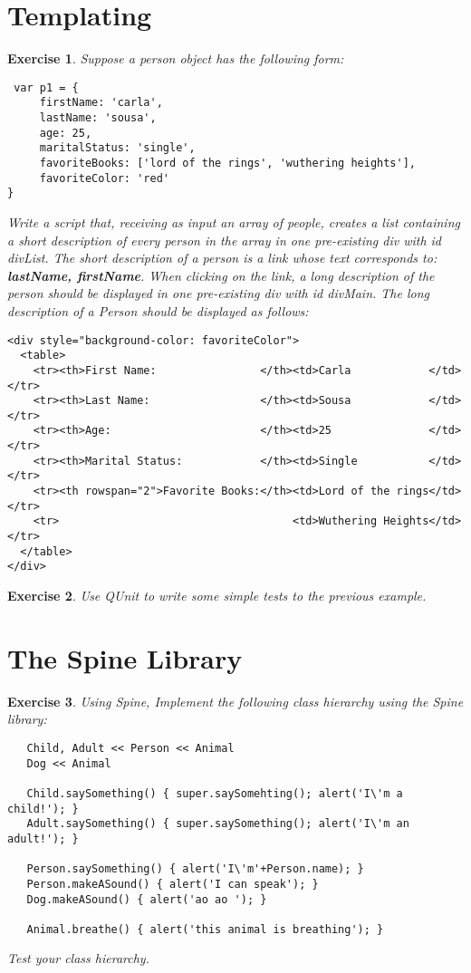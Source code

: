 \documentclass{article}
\newtheorem{ex}{Exercise}[section]
\begin{document}
\section{Templating} 

\begin{ex}
Suppose a person object has the following form: 
\begin{verbatim}
 var p1 = {
     firstName: 'carla', 
     lastName: 'sousa',
     age: 25, 
     maritalStatus: 'single', 
     favoriteBooks: ['lord of the rings', 'wuthering heights'], 
     favoriteColor: 'red'
}
\end{verbatim}
Write a script that, receiving as input an array of people, creates 
a list containing a short description of every person in the array in 
one pre-existing div with id divList. The short description of a 
person is a link whose text corresponds to: \textbf{lastName, firstName}. 
When clicking on the link, a long description of the person 
should be displayed in one pre-existing div with id divMain. The long 
description of a Person should be displayed as follows:
\begin{verbatim} 
<div style="background-color: favoriteColor">
  <table>
    <tr><th>First Name:                </th><td>Carla            </td></tr> 
    <tr><th>Last Name:                 </th><td>Sousa            </td></tr>
    <tr><th>Age:                       </th><td>25               </td></tr>
    <tr><th>Marital Status:            </th><td>Single           </td></tr>
    <tr><th rowspan="2">Favorite Books:</th><td>Lord of the rings</td></tr> 
    <tr>                                    <td>Wuthering Heights</td></tr>
  </table>
</div> 
\end{verbatim}
\end{ex}

\begin{ex}
Use QUnit to write some simple tests to the previous example.
\end{ex}


\section{The Spine Library} 

\begin{ex}
Using Spine, Implement the following class hierarchy using the Spine library: 
\begin{verbatim}
   Child, Adult << Person << Animal 
   Dog << Animal   
   
   Child.saySomething() { super.saySomehting(); alert('I\'m a child!'); }  
   Adult.saySomething() { super.saySomething(); alert('I\'m an adult!'); }
   
   Person.saySomething() { alert('I\'m'+Person.name); } 
   Person.makeASound() { alert('I can speak'); } 
   Dog.makeASound() { alert('ao ao '); }
   
   Animal.breathe() { alert('this animal is breathing'); }   
\end{verbatim} 
Test your class hierarchy. 
\end{ex} 
\end{document}
